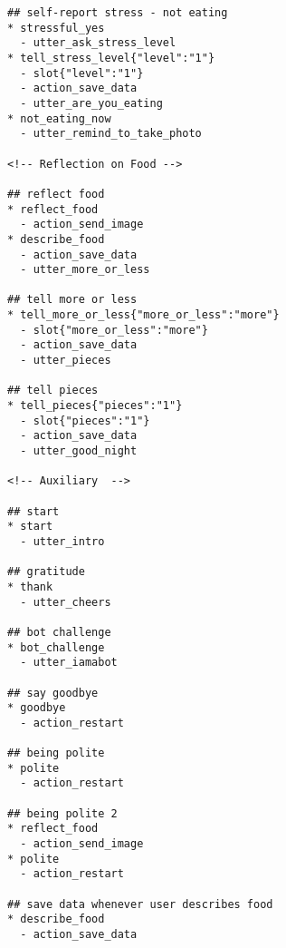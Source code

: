 \begin{lstlisting}
## self-report stress - not eating
* stressful_yes
  - utter_ask_stress_level
* tell_stress_level{"level":"1"}
  - slot{"level":"1"}
  - action_save_data
  - utter_are_you_eating
* not_eating_now
  - utter_remind_to_take_photo

<!-- Reflection on Food -->

## reflect food
* reflect_food
  - action_send_image
* describe_food
  - action_save_data
  - utter_more_or_less

## tell more or less
* tell_more_or_less{"more_or_less":"more"}
  - slot{"more_or_less":"more"}
  - action_save_data
  - utter_pieces

## tell pieces
* tell_pieces{"pieces":"1"}
  - slot{"pieces":"1"}
  - action_save_data
  - utter_good_night

<!-- Auxiliary  -->

## start
* start
  - utter_intro

## gratitude
* thank
  - utter_cheers

## bot challenge
* bot_challenge
  - utter_iamabot

## say goodbye
* goodbye
  - action_restart

## being polite
* polite
  - action_restart

## being polite 2
* reflect_food
  - action_send_image
* polite
  - action_restart

## save data whenever user describes food
* describe_food
  - action_save_data
\end{lstlisting}

\bigskip\bigskip
